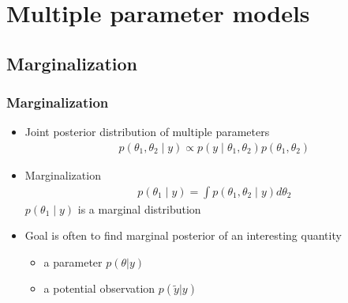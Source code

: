 \documentclass[10pt]{beamer}
\begin{document}
\section{Multiple parameter models}
\subsection{Marginalization}

\begin{frame}
\frametitle{Marginalization}

  \begin{itemize}
  \item Joint posterior distribution of multiple parameters
    \begin{align*}
      p(\theta_1,\theta_2 \mid y) \propto p(y \mid \theta_1,\theta_2)p(\theta_1,\theta_2)
    \end{align*}
  \pause
  \item {\color{uured} Marginalization}
      \begin{align*}
        p(\theta_1 \mid y) = \int p(\theta_1,\theta_2 \mid y) d\theta_2
      \end{align*}
      $p(\theta_1 \mid y)$ is a marginal distribution
       \vspace{0.5\baselineskip}
  \pause
 \item Goal is often to find marginal posterior of an interesting quantity
   \begin{itemize}
   \item a {\color{uured} parameter} $p(\theta|y)$
   \item a {\color{uured} potential observation} $p(\tilde{y}|y)$
   \end{itemize}
  \end{itemize}

\end{frame}
\end{document}
